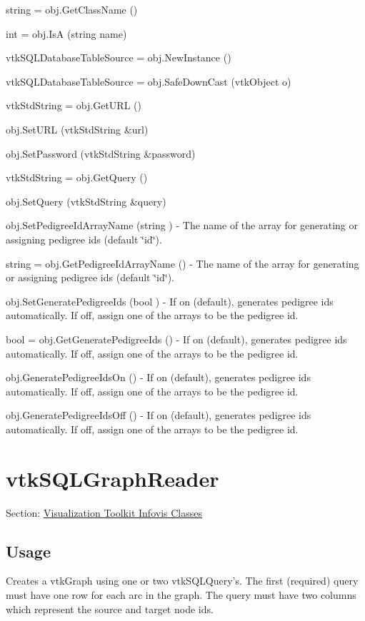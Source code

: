 \begin{DoxyItemize}
\item {\ttfamily string = obj.\-Get\-Class\-Name ()}  
\item {\ttfamily int = obj.\-Is\-A (string name)}  
\item {\ttfamily vtk\-S\-Q\-L\-Database\-Table\-Source = obj.\-New\-Instance ()}  
\item {\ttfamily vtk\-S\-Q\-L\-Database\-Table\-Source = obj.\-Safe\-Down\-Cast (vtk\-Object o)}  
\item {\ttfamily vtk\-Std\-String = obj.\-Get\-U\-R\-L ()}  
\item {\ttfamily obj.\-Set\-U\-R\-L (vtk\-Std\-String \&url)}  
\item {\ttfamily obj.\-Set\-Password (vtk\-Std\-String \&password)}  
\item {\ttfamily vtk\-Std\-String = obj.\-Get\-Query ()}  
\item {\ttfamily obj.\-Set\-Query (vtk\-Std\-String \&query)}  
\item {\ttfamily obj.\-Set\-Pedigree\-Id\-Array\-Name (string )} -\/ The name of the array for generating or assigning pedigree ids (default \char`\"{}id\char`\"{}).  
\item {\ttfamily string = obj.\-Get\-Pedigree\-Id\-Array\-Name ()} -\/ The name of the array for generating or assigning pedigree ids (default \char`\"{}id\char`\"{}).  
\item {\ttfamily obj.\-Set\-Generate\-Pedigree\-Ids (bool )} -\/ If on (default), generates pedigree ids automatically. If off, assign one of the arrays to be the pedigree id.  
\item {\ttfamily bool = obj.\-Get\-Generate\-Pedigree\-Ids ()} -\/ If on (default), generates pedigree ids automatically. If off, assign one of the arrays to be the pedigree id.  
\item {\ttfamily obj.\-Generate\-Pedigree\-Ids\-On ()} -\/ If on (default), generates pedigree ids automatically. If off, assign one of the arrays to be the pedigree id.  
\item {\ttfamily obj.\-Generate\-Pedigree\-Ids\-Off ()} -\/ If on (default), generates pedigree ids automatically. If off, assign one of the arrays to be the pedigree id.  
\end{DoxyItemize}\hypertarget{vtkinfovis_vtksqlgraphreader}{}\section{vtk\-S\-Q\-L\-Graph\-Reader}\label{vtkinfovis_vtksqlgraphreader}
Section\-: \hyperlink{sec_vtkinfovis}{Visualization Toolkit Infovis Classes} \hypertarget{vtkwidgets_vtkxyplotwidget_Usage}{}\subsection{Usage}\label{vtkwidgets_vtkxyplotwidget_Usage}
Creates a vtk\-Graph using one or two vtk\-S\-Q\-L\-Query's. The first (required) query must have one row for each arc in the graph. The query must have two columns which represent the source and target node ids.

